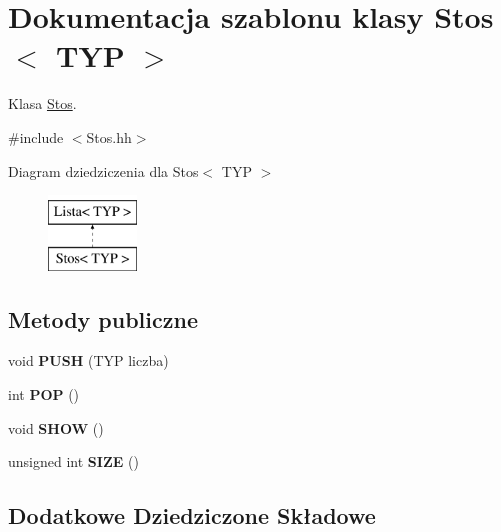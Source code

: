 \hypertarget{class_stos}{\section{Dokumentacja szablonu klasy Stos$<$ T\-Y\-P $>$}
\label{class_stos}
}


Klasa \hyperlink{class_stos}{Stos}.  




{\ttfamily \#include $<$Stos.\-hh$>$}

Diagram dziedziczenia dla Stos$<$ T\-Y\-P $>$\begin{figure}[H]
\begin{center}
\leavevmode
\includegraphics[height=2.000000cm]{class_stos}
\end{center}
\end{figure}
\subsection*{Metody publiczne}
\begin{DoxyCompactItemize}
\item 
\hypertarget{class_stos_a773cf22cb5c67bda0d2878a1ec8bc363}{void {\bfseries P\-U\-S\-H} (T\-Y\-P liczba)}\label{class_stos_a773cf22cb5c67bda0d2878a1ec8bc363}

\item 
\hypertarget{class_stos_ab8b0ecec7cbe0ae761bfee9d9e47d5d4}{int {\bfseries P\-O\-P} ()}\label{class_stos_ab8b0ecec7cbe0ae761bfee9d9e47d5d4}

\item 
\hypertarget{class_stos_a8f1c40b779a699c84b20eeb59ca67f06}{void {\bfseries S\-H\-O\-W} ()}\label{class_stos_a8f1c40b779a699c84b20eeb59ca67f06}

\item 
\hypertarget{class_stos_a6ff0d2aa5946c0dc413e3236ca99fd26}{unsigned int {\bfseries S\-I\-Z\-E} ()}\label{class_stos_a6ff0d2aa5946c0dc413e3236ca99fd26}

\end{DoxyCompactItemize}
\subsection*{Dodatkowe Dziedziczone Składowe}


